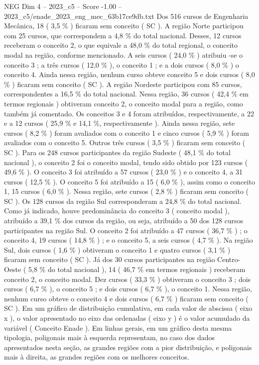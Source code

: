 \begin{textsample}{NEG Dim 4 – 2023\_c5 – Score -1.00 – 2023\_c5/enade\_2023\_eng\_mec\_63b17ce9db.txt}
Dos 516 cursos de Engenharia Mecânica, 18 ( 3,5 \% ) ficaram sem conceito ( SC ).
A região Norte participou com 25 cursos, que correspondem a 4,8 \% do total nacional.
Desses, 12 cursos receberam o conceito 2, o que equivale a 48,0 \% do total regional, o conceito modal na região, conforme mencionado.
A seis cursos ( 24,0 \% ) atribuiu -se o conceito 3 ; a três cursos ( 12,0 \% ), o conceito 1 ; e a dois cursos ( 8,0 \% ) o conceito 4.
Ainda nessa região, nenhum curso obteve conceito 5 e dois cursos ( 8,0 \% ) ficaram sem conceito ( SC ).
A região Nordeste participou com 85 cursos, correspondentes a 16,5 \% do total nacional.
Nessa região, 36 cursos ( 42,4 \% em termos regionais ) obtiveram conceito 2, o conceito modal para a região, como também já comentado.
Os conceitos 3 e 4 foram atribuídos, respectivamente, a 22 e a 12 cursos ( 25,9 \% e 14,1 \%, respectivamente ).
Ainda nessa região, sete cursos ( 8,2 \% ) foram avaliados com o conceito 1 e cinco cursos ( 5,9 \% ) foram avaliados com o conceito 5.
Outros três cursos ( 3,5 \% ) ficaram sem conceito ( SC ).
Para os 248 cursos participantes da região Sudeste ( 48,1 \% do total nacional ), o conceito 2 foi o conceito modal, tendo sido obtido por 123 cursos ( 49,6 \% ).
O conceito 3 foi atribuído a 57 cursos ( 23,0 \% ) e o conceito 4, a 31 cursos ( 12,5 \% ).
O conceito 5 foi atribuído a 15 ( 6,0 \% ), assim como o conceito 1, 15 cursos ( 6,0 \% ).
Nessa região, sete cursos ( 2,8 \% ) ficaram sem conceito ( SC ).
Os 128 cursos da região Sul corresponderam a 24,8 \% do total nacional.
Como já indicado, houve predominância do conceito 3 ( conceito modal ), atribuído a 39,1 \% dos cursos da região, ou seja, atribuído a 50 dos 128 cursos participantes na região Sul.
O conceito 2 foi atribuído a 47 cursos ( 36,7 \% ) ; o conceito 4, 19 cursos ( 14,8 \% ) ; e o conceito 5, a seis cursos ( 4,7 \% ).
Na região Sul, dois cursos ( 1,6 \% ) obtiveram o conceito 1 e quatro cursos ( 3,1 \% ) ficaram sem conceito ( SC ).
Já dos 30 cursos participantes na região Centro-Oeste ( 5,8 \% do total nacional ), 14 ( 46,7 \% em termos regionais ) receberam conceito 2, o conceito modal.
Dez cursos ( 33,3 \% ) obtiveram o conceito 3 ; dois cursos ( 6,7 \% ), o conceito 5 ; e dois cursos ( 6,7 \% ), o conceito 1.
Nessa região, nenhum curso obteve o conceito 4 e dois cursos ( 6,7 \% ) ficaram sem conceito ( SC ).
Em um gráfico de distribuição cumulativa, em cada valor de abscissa ( eixo x ), o valor apresentado no eixo das ordenadas ( eixo y ) é o valor acumulado da variável ( Conceito Enade ).
Em linhas gerais, em um gráfico desta mesma tipologia, poligonais mais à esquerda representam, no caso dos dados apresentados nesta seção, as grandes regiões com a pior distribuição, e poligonais mais à direita, as grandes regiões com os melhores conceitos.

\end{textsample}
